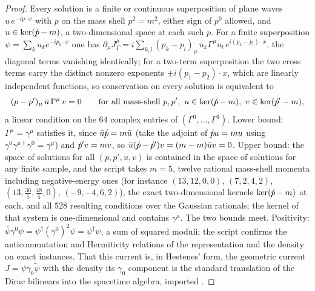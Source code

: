 \documentclass[11pt]{article}
\theoremstyle{definition}
\newcommand{\slashed}[1]{{#1}\mkern-10mu/}
\begin{document}
\begin{proof}
Every solution is a finite or continuous superposition of plane waves $u\,e^{-ip\cdot x}$ with $p$ on the mass shell $p^{2} = m^{2}$, either sign of $p^{0}$ allowed, and $u \in \ker(\slashed{p} - m)$, a two-dimensional space at each such $p$. For a finite superposition $\psi = \sum_{k} u_{k}e^{-ip_{k}\cdot x}$ one has $\partial_{\mu}J^{\mu}_{\Gamma} = i\sum_{k,l}(p_{k} - p_{l})_{\mu}\,\bar{u}_{k}\Gamma^{\mu}u_{l}\,e^{i(p_{k} - p_{l})\cdot x}$, the diagonal terms vanishing identically; for a two-term superposition the two cross terms carry the distinct nonzero exponents $\pm i(p_{1} - p_{2})\cdot x$, which are linearly independent functions, so conservation on every solution is equivalent to
\[
(p - p')_{\mu}\,\bar{u}\,\Gamma^{\mu}\,v = 0 \qquad \text{for all mass-shell } p, p',\ u \in \ker(\slashed{p} - m),\ v \in \ker(\slashed{p}' - m),
\]
a linear condition on the $64$ complex entries of $(\Gamma^{0}, \dots, \Gamma^{3})$. Lower bound: $\Gamma^{\mu} = \gamma^{\mu}$ satisfies it, since $\bar{u}\slashed{p} = m\bar{u}$ (take the adjoint of $\slashed{p}u = mu$ using $\gamma^{0}\gamma^{\mu\dagger}\gamma^{0} = \gamma^{\mu}$) and $\slashed{p}'v = mv$, so $\bar{u}(\slashed{p} - \slashed{p}')v = (m - m)\bar{u}v = 0$. Upper bound: the space of solutions for all $(p, p', u, v)$ is contained in the space of solutions for any finite sample, and the script takes $m = 5$, twelve rational mass-shell momenta including negative-energy ones (for instance $(13, 12, 0, 0)$, $(7, 2, 4, 2)$, $(13, \tfrac{36}{5}, \tfrac{48}{5}, 0)$, $(-9, -4, 6, 2)$), the exact two-dimensional kernels $\ker(\slashed{p} - m)$ at each, and all $528$ resulting conditions over the Gaussian rationals; the kernel of that system is one-dimensional and contains $\gamma^{\mu}$. The two bounds meet. Positivity: $\bar{\psi}\gamma^{0}\psi = \psi^{\dagger}(\gamma^{0})^{2}\psi = \psi^{\dagger}\psi$, a sum of squared moduli; the script confirms the anticommutation and Hermiticity relations of the representation and the density on exact instances. That this current is, in Hestenes' form, the geometric current $J = \psi\gamma_{0}\tilde{\psi}$ with the density its $\gamma_{0}$ component is the standard translation of the Dirac bilinears into the spacetime algebra, imported \cite{Hestenes1975}.
\end{proof}
\end{document}
